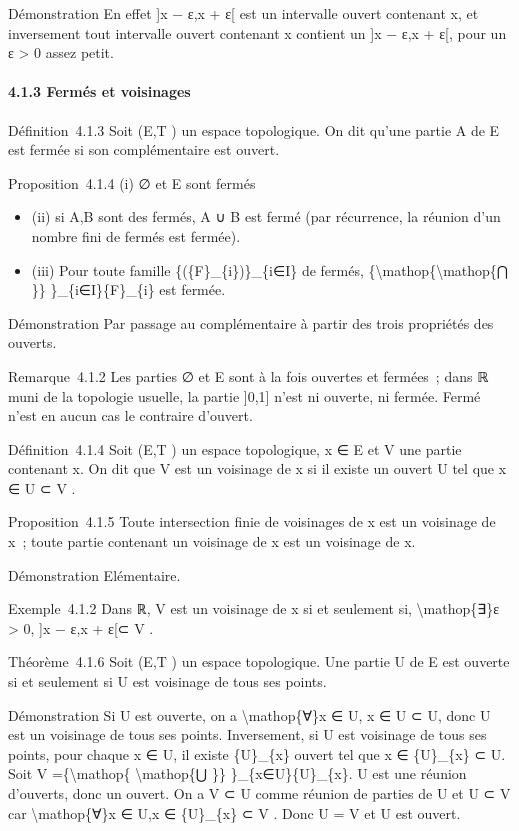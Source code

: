 \documentclass[]{article}
\begin{document}
Démonstration En effet {]}x − ε,x + ε{[} est un intervalle ouvert
contenant x, et inversement tout intervalle ouvert contenant x contient
un {]}x − ε,x + ε{[}, pour un ε \textgreater{} 0 assez petit.

\paragraph{4.1.3 Fermés et voisinages}

Définition~4.1.3 Soit (E,T ) un espace topologique. On dit qu'une partie
A de E est fermée si son complémentaire est ouvert.

Proposition~4.1.4 (i) ∅ et E sont fermés

\begin{itemize}
\itemsep1pt\parskip0pt
\item
  (ii) si A,B sont des fermés, A ∪ B est fermé (par récurrence, la
  réunion d'un nombre fini de fermés est fermée).
\item
  (iii) Pour toute famille \{(\{F\}\_\{i\})\}\_\{i∈I\} de fermés,
  \{\textbackslash{}mathop\{\textbackslash{}mathop\{⋂ \}\}
  \}\_\{i∈I\}\{F\}\_\{i\} est fermée.
\end{itemize}

Démonstration Par passage au complémentaire à partir des trois
propriétés des ouverts.

Remarque~4.1.2 Les parties ∅ et E sont à la fois ouvertes et fermées~;
dans ℝ muni de la topologie usuelle, la partie {]}0,1{]} n'est ni
ouverte, ni fermée. Fermé n'est en aucun cas le contraire d'ouvert.

Définition~4.1.4 Soit (E,T ) un espace topologique, x ∈ E et V une
partie contenant x. On dit que V est un voisinage de x si il existe un
ouvert U tel que x ∈ U ⊂ V .

Proposition~4.1.5 Toute intersection finie de voisinages de x est un
voisinage de x~; toute partie contenant un voisinage de x est un
voisinage de x.

Démonstration Elémentaire.

Exemple~4.1.2 Dans ℝ, V est un voisinage de x si et seulement si,
\textbackslash{}mathop\{∃\}ε \textgreater{} 0, {]}x − ε,x + ε{[}⊂ V .

Théorème~4.1.6 Soit (E,T ) un espace topologique. Une partie U de E est
ouverte si et seulement si U est voisinage de tous ses points.

Démonstration Si U est ouverte, on a \textbackslash{}mathop\{∀\}x ∈ U, x
∈ U ⊂ U, donc U est un voisinage de tous ses points. Inversement, si U
est voisinage de tous ses points, pour chaque x ∈ U, il existe
\{U\}\_\{x\} ouvert tel que x ∈ \{U\}\_\{x\} ⊂ U. Soit V
=\{\textbackslash{}mathop\{ \textbackslash{}mathop\{⋃ \}\}
\}\_\{x∈U\}\{U\}\_\{x\}. U est une réunion d'ouverts, donc un ouvert. On
a V ⊂ U comme réunion de parties de U et U ⊂ V car
\textbackslash{}mathop\{∀\}x ∈ U,x ∈ \{U\}\_\{x\} ⊂ V . Donc U = V et U
est ouvert.
\end{document}
